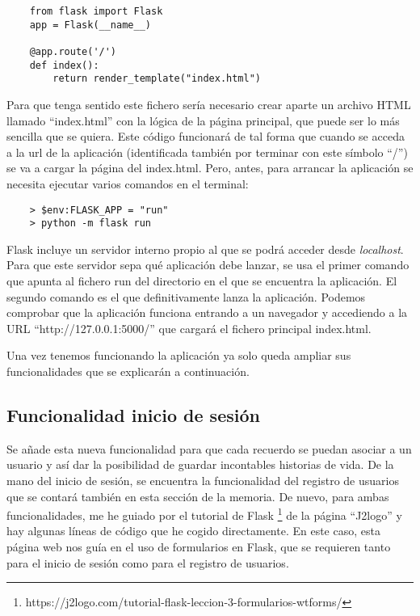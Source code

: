 \begin{verbatim}
	from flask import Flask
	app = Flask(__name__)
	
	@app.route('/')
	def index():
		return render_template("index.html")
\end{verbatim}

Para que tenga sentido este fichero sería necesario crear aparte un archivo HTML llamado ``index.html'' con la lógica de la página principal, que puede ser lo más sencilla que se quiera. Este código funcionará de tal forma que cuando se acceda a la url de la aplicación (identificada también por terminar con este símbolo ``/'') se va a cargar la página del index.html. Pero, antes, para arrancar la aplicación se necesita ejecutar varios comandos en el terminal:

\begin{verbatim}
	> $env:FLASK_APP = "run"
	> python -m flask run
\end{verbatim}

Flask incluye un servidor interno propio al que se podrá acceder desde \textit{localhost}. Para que este servidor sepa qué aplicación debe lanzar, se usa el primer comando que apunta al fichero run del directorio en el que se encuentra la aplicación. El segundo comando es el que definitivamente lanza la aplicación. Podemos comprobar que la aplicación funciona entrando a un navegador y accediendo a la URL ``http://127.0.0.1:5000/'' que cargará el fichero principal index.html. 

Una vez tenemos funcionando la aplicación ya solo queda ampliar sus funcionalidades que se explicarán a continuación. 


\subsection{Funcionalidad inicio de sesión}

Se añade esta nueva funcionalidad para que cada recuerdo se puedan asociar a un usuario y así dar la posibilidad de guardar incontables historias de vida. De la mano del inicio de sesión, se encuentra la funcionalidad del registro de usuarios que se contará también en esta sección de la memoria. De nuevo, para ambas funcionalidades, me he guiado por el tutorial de Flask \footnote{https://j2logo.com/tutorial-flask-leccion-3-formularios-wtforms/} de la página ``J2logo'' y hay algunas líneas de código que he cogido directamente. En este caso, esta página web nos guía en el uso de formularios en Flask, que se requieren tanto para el inicio de sesión como para el registro de usuarios. 

